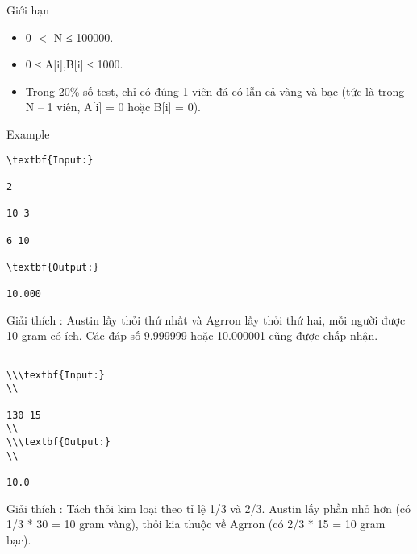 Giới hạn  
\begin{itemize}
	\item     0 $<$ N ≤ 100000.   
	\item     0 ≤ A[i],B[i] ≤ 1000.   
	\item     Trong 20\% số test, chỉ có đúng 1 viên đá có lẫn cả vàng và bạc (tức là trong N – 1 viên, A[i] = 0 hoặc B[i] = 0).   
\end{itemize}
   Example  
\begin{verbatim}
\textbf{Input:}

2

10 3

6 10

\textbf{Output:}

10.000\end{verbatim}

Giải thích        : Austin lấy thỏi thứ nhất và Agrron lấy thỏi thứ hai, mỗi người được 10 gram có ích. Các đáp số 9.999999 hoặc 10.000001 cũng được chấp nhận.
\begin{verbatim}

\\\textbf{Input:}
\\

130 15
\\
\\\textbf{Output:}
\\

10.0\end{verbatim}

Giải thích        : Tách thỏi kim loại theo tỉ lệ 1/3 và 2/3. Austin lấy phần nhỏ hơn (có 1/3 * 30 = 10 gram vàng), thỏi kia thuộc về Agrron (có 2/3 * 15 = 10 gram bạc).